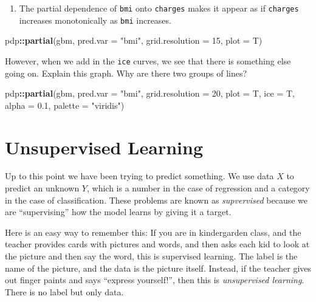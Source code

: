 \documentclass[
  openany]{book}
\newenvironment{Shaded}{\begin{snugshade}}{\end{snugshade}}
\newcommand{\DataTypeTok}[1]{\textcolor[rgb]{0.13,0.29,0.53}{#1}}
\newcommand{\DecValTok}[1]{\textcolor[rgb]{0.00,0.00,0.81}{#1}}
\newcommand{\FloatTok}[1]{\textcolor[rgb]{0.00,0.00,0.81}{#1}}
\newcommand{\KeywordTok}[1]{\textcolor[rgb]{0.13,0.29,0.53}{\textbf{#1}}}
\newcommand{\NormalTok}[1]{#1}
\newcommand{\OperatorTok}[1]{\textcolor[rgb]{0.81,0.36,0.00}{\textbf{#1}}}
\newcommand{\StringTok}[1]{\textcolor[rgb]{0.31,0.60,0.02}{#1}}
\providecommand{\tightlist}{%
  \setlength{\itemsep}{0pt}\setlength{\parskip}{0pt}}
\begin{document}
\begin{enumerate}
\def\labelenumi{\arabic{enumi}.}
\setcounter{enumi}{2}
\tightlist
\item
  The partial dependence of \texttt{bmi} onto \texttt{charges} makes it appear as if \texttt{charges} increases monotonically as \texttt{bmi} increases.
\end{enumerate}

\begin{Shaded}
\begin{Highlighting}[]
\NormalTok{pdp}\OperatorTok{::}\KeywordTok{partial}\NormalTok{(gbm, }\DataTypeTok{pred.var =} \StringTok{"bmi"}\NormalTok{, }\DataTypeTok{grid.resolution =} \DecValTok{15}\NormalTok{, }\DataTypeTok{plot =}\NormalTok{ T)}
\end{Highlighting}
\end{Shaded}

However, when we add in the \texttt{ice} curves, we see that there is something else going on. Explain this graph. Why are there two groups of lines?

\begin{Shaded}
\begin{Highlighting}[]
\NormalTok{pdp}\OperatorTok{::}\KeywordTok{partial}\NormalTok{(gbm, }\DataTypeTok{pred.var =} \StringTok{"bmi"}\NormalTok{, }\DataTypeTok{grid.resolution =} \DecValTok{20}\NormalTok{, }\DataTypeTok{plot =}\NormalTok{ T, }\DataTypeTok{ice =}\NormalTok{ T, }\DataTypeTok{alpha =} \FloatTok{0.1}\NormalTok{, }\DataTypeTok{palette =} \StringTok{"viridis"}\NormalTok{)}
\end{Highlighting}
\end{Shaded}

\hypertarget{unsupervised-learning}{%
\chapter{Unsupervised Learning}\label{unsupervised-learning}}

Up to this point we have been trying to predict something. We use data \(X\) to predict an unknown \(Y\), which is a number in the case of regression and a category in the case of classification. These problems are known as \emph{supvervised} because we are ``supervising'' how the model learns by giving it a target.

Here is an easy way to remember this: If you are in kindergarden class, and the teacher provides cards with pictures and words, and then asks each kid to look at the picture and then say the word, this is supervised learning. The label is the name of the picture, and the data is the picture itself. Instead, if the teacher gives out finger paints and says ``express yourself!'', then this is \emph{unsupervised learning}. There is no label but only data.
\end{document}
